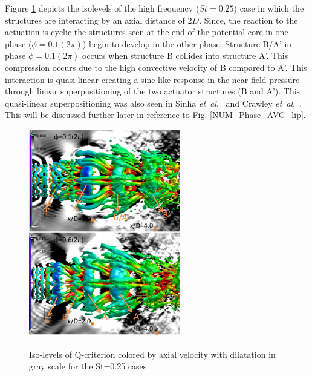 \documentclass[english]{aiaa-tc}
\newcommand*{\etal}{\textit{et~al}.\ }
\begin{document}
Figure \ref{fig:isolevels} depicts the isolevels of the high frequency ($St=0.25$) case in which the structures are interacting by an axial distance of $2D$.
Since, the reaction to the actuation is cyclic the structures seen at the end of the potential core in one phase ($\phi=0.1(2\pi)$) begin to develop in the other phase. Structure B/A' in phase $\phi=0.1(2\pi)$ occurs when structure B collides into structure A'. This compression occurs due to the high convective velocity of B compared to A'. This interaction is quasi-linear creating a sine-like response in the near field pressure through linear superpositioning of the two actuator structures (B and A'). This quasi-linear superpositioning was also seen in Sinha \etal \cite{sinha2013} and Crawley \etal \cite{Crawley2014}. This will be discussed further later in reference to Fig. \ref{NUM_Phase_AVG_lip}.
\begin{figure}
\begin{center}
\begin{centering}
{\includegraphics[width=2.6in]{M09St025qcritphase0106AB}}
\end{centering}
\caption{Iso-levels of Q-criterion colored by axial velocity with dilatation in gray scale for the St=0.25 cases}
\label{fig:isolevels}
\end{center}
\end{figure}
\end{document}

